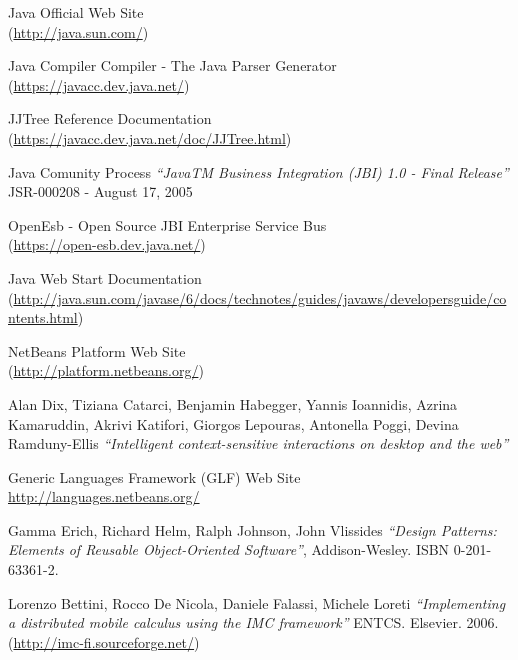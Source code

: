 \begin{thebibliography}{99}
 Java Official Web Site \\ 
(\href{http://java.sun.com/}{http://java.sun.com/})

 Java Compiler Compiler - The Java Parser
Generator \\ (\href{https://javacc.dev.java.net/}{https://javacc.dev.java.net/})

 JJTree Reference Documentation\\
(\href{https://javacc.dev.java.net/doc/JJTree.html}{https://javacc.dev.java.net/doc/JJTree.html})

 Java Comunity Process \emph{``JavaTM Business Integration (JBI)
1.0 - Final Release''} JSR-000208 - August 17, 2005

 OpenEsb - Open Source JBI Enterprise Service Bus \\
(\href{https://open-esb.dev.java.net/}{https://open-esb.dev.java.net/})

 Java Web Start Documentation \\
(\href{http://java.sun.com/javase/6/docs/technotes/guides/javaws/developersguide/contents.html}{http://java.sun.com/javase/6/docs/technotes/guides/javaws/developersguide/contents.html})

 NetBeans Platform Web Site \\
(\href{http://platform.netbeans.org/}{http://platform.netbeans.org/})

 Alan Dix, Tiziana Catarci, Benjamin Habegger,
Yannis Ioannidis, Azrina Kamaruddin, Akrivi Katifori, Giorgos Lepouras, Antonella Poggi, Devina Ramduny-Ellis
\emph{``Intelligent context-sensitive interactions on desktop and the web''}

 Generic Languages Framework (GLF) Web Site \\
\href{http://languages.netbeans.org/}{http://languages.netbeans.org/}

 Gamma Erich, Richard Helm, Ralph Johnson, John Vlissides
\emph{``Design Patterns: Elements of Reusable Object-Oriented Software''},
Addison-Wesley. ISBN 0-201-63361-2.

 Lorenzo Bettini, Rocco De Nicola, Daniele Falassi, Michele Loreti
\emph{``Implementing a distributed mobile calculus using the IMC framework''}
ENTCS. Elsevier. 2006.\\
(\href{http://imc-fi.sourceforge.net/}{http://imc-fi.sourceforge.net/})


\end{thebibliography}
